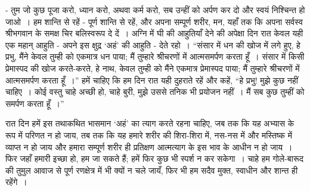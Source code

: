 - तुम जो कुछ पूजा करो, ध्यान करो, अथवा कर्म करो, सब उन्हीं को अर्पण कर दो और स्वयं निश्चिन्त हो जाओ~। हम शान्ति से रहें - पूर्ण शान्ति से रहें, और अपना सम्पूर्ण शरीर, मन, यहाँ तक कि अपना सर्वस्व श्रीभगवान के समक्ष चिर बलिस्वरूप दे दें~। अग्नि में घी की आहुतियाँ देने की अपेक्षा दिन रात केवल यही एक महान् आहुति - अपने इस क्षुद्र ‘अहं’ की आहुति - देते रहो~। “संसार में धन की खोज में लगे हुए, हे प्रभु, मैंने केवल तुम्ही को एकमात्र धन पाया; मैं तुम्हारे श्रीचरणों में आत्मसमर्पण करता हूँ~। संसार में किसी प्रेमास्पद की खोज करते-करते, हे नाथ, केवल तुम्ही को मैंने एकमात्र प्रेमास्पद पाया; मैं तुम्हारे श्रीचरणों में आत्मसमर्पण करता हूँ~।” हमें चाहिए कि हम दिन रात यही दुहराते रहें और कहें, “हे प्रभु! मुझे कुछ नहीं चाहिए~। कोई वस्तु चाहे अच्छी हो, चाहे बुरी, मुझे उससे तनिक भी प्रयोजन नहीं~। मैं सब कुछ तुम्हीं को समर्पण करता हूँ~।”

रात दिन हमें इस तथाकथित भासमान ‘अहं’ का त्याग करते रहना चाहिए, जब तक कि यह अभ्यास के रूप में परिणत न हो जाय, तब तक कि यह हमारे शरीर की शिरा-शिरा में, नस-नस में और मस्तिष्क में व्याप्त न हो जाय और हमारा सम्पूर्ण शरीर ही प्रतिक्षण आत्मत्याग के इस भाव के आधीन न हो जाय~। फिर जहाँ हमारी इच्छा हो, हम जा सकते हैं; हमें फिर कुछ भी स्पर्श न कर सकेगा~। चाहे हम गोले-बारूद की तुमुल आवाज से पूर्ण रणक्षेत्र में भी क्यों न चले जायँ, फिर भी हम सदैव मुक्त, स्वाधीन और शान्त ही रहेंगे~।


